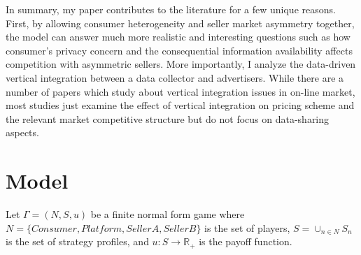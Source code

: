 \documentclass[12pt]{article}
\begin{document}
In summary, my paper contributes to the literature for a few unique reasons. First, by allowing consumer heterogeneity and seller market asymmetry together, the model can answer much more realistic and interesting questions such as how consumer's privacy concern and the consequential information availability affects competition with asymmetric sellers. More importantly, I analyze the data-driven vertical integration between a data collector and advertisers. While there are a number of papers which study about vertical integration issues in on-line market, most studies just examine the effect of vertical integration on pricing scheme and the relevant market competitive structure but do not focus on data-sharing aspects.  


	\section{Model}
Let $\Gamma=(N, S, u)$ be a finite normal form game where $N=\{Consumer, Platform, Seller A, Seller B\}$ is the set of players, $S=\cup_{n\in N}S_n$ is the set of strategy profiles, and $u: S \rightarrow \mathbb{R}_+$ is the payoff function. 
\end{document}
